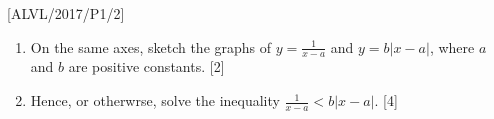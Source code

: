 \item {[}ALVL/2017/P1/2{]}
\begin{enumerate}
\item On the same axes, sketch the graphs of $y=\frac{1}{x-a}$ and $y=b\left|x-a\right|$,
where $a$ and $b$ are positive constants. \hfill{}{[}2{]}
\item Hence, or otherwrse, solve the inequality $\frac{1}{x-a}<b\left|x-a\right|$.
\hfill{}{[}4{]}
\end{enumerate}
